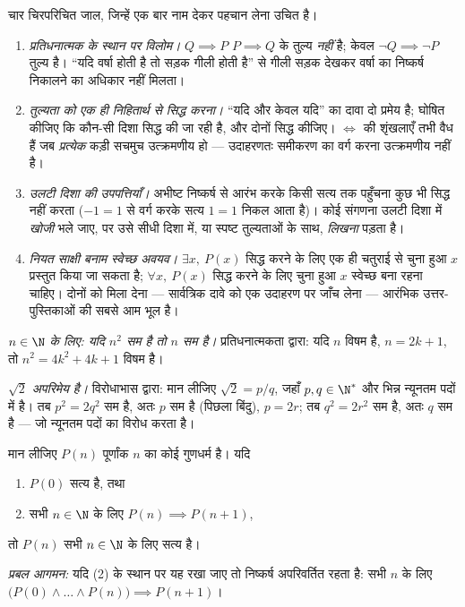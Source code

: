\begin{remark}[उपपत्तियों में सामान्य भूलें]\label{rem:b1:logic:pitfalls}
चार चिरपरिचित जाल, जिन्हें एक बार नाम देकर पहचान लेना उचित है।
\begin{enumerate}
  \item \emph{प्रतिधनात्मक के स्थान पर विलोम।} $Q \implies P$ $P \implies Q$
  के तुल्य \emph{नहीं} है; केवल $\lnot Q \implies \lnot P$ तुल्य है। ``यदि
  वर्षा होती है तो सड़क गीली होती है'' से गीली सड़क देखकर वर्षा का निष्कर्ष
  निकालने का अधिकार नहीं मिलता।
  \item \emph{तुल्यता को एक ही निहितार्थ से सिद्ध करना।} ``यदि और केवल यदि''
  का दावा दो प्रमेय है; घोषित कीजिए कि कौन-सी दिशा सिद्ध की जा रही है, और
  दोनों सिद्ध कीजिए। $\iff$ की शृंखलाएँ तभी वैध हैं जब \emph{प्रत्येक} कड़ी
  सचमुच उत्क्रमणीय हो --- उदाहरणतः समीकरण का वर्ग करना उत्क्रमणीय नहीं है।
  \item \emph{उलटी दिशा की उपपत्तियाँ।} अभीष्ट निष्कर्ष से आरंभ करके किसी
  सत्य  तक पहुँचना कुछ भी सिद्ध नहीं करता ($-1 = 1$ से वर्ग करके सत्य $1
  = 1$ निकल आता है)। कोई संगणना उलटी दिशा में \emph{खोजी} भले जाए, पर उसे
  सीधी दिशा में, या स्पष्ट तुल्यताओं के साथ, \emph{लिखना} पड़ता है।
  \item \emph{नियत साक्षी बनाम स्वेच्छ अवयव।} $\exists x,\ P(x)$ सिद्ध करने
  के लिए एक ही चतुराई से चुना हुआ $x$ प्रस्तुत किया जा सकता है; $\forall x,\
  P(x)$ सिद्ध करने के लिए चुना हुआ $x$ स्वेच्छ बना रहना चाहिए। दोनों को मिला
  देना --- सार्वत्रिक दावे को एक उदाहरण पर जाँच लेना --- आरंभिक
  उत्तर-पुस्तिकाओं की सबसे आम भूल है।
\end{enumerate}
\end{remark}

\begin{example}[प्रतिधनात्मकता और विरोधाभास काम पर]\label{ex:b1:logic:sqrt2}
\emph{$n \in \N$ के लिए: यदि $n^2$ सम है तो $n$ सम है।} प्रतिधनात्मकता
द्वारा: यदि $n$ विषम है, $n = 2k+1$, तो $n^2 = 4k^2 + 4k + 1$ विषम है।

\emph{$\sqrt 2$ अपरिमेय है।} विरोधाभास द्वारा: मान लीजिए $\sqrt 2 = p/q$,
जहाँ $p, q \in \N^*$ और भिन्न न्यूनतम पदों में है। तब $p^2 = 2q^2$ सम है,
अतः $p$ सम है (पिछला बिंदु), $p = 2r$; तब $q^2 = 2r^2$ सम है, अतः $q$ सम है
--- जो न्यूनतम पदों का विरोध करता है।
\end{example}

\begin{theorem}[आगमन]\label{thm:b1:logic:induction}
मान लीजिए $P(n)$ पूर्णांक $n$ का कोई गुणधर्म है। यदि
\begin{enumerate}
  \item $P(0)$ सत्य है, तथा
  \item सभी $n \in \N$ के लिए $P(n) \implies P(n+1)$,
\end{enumerate}
तो $P(n)$ सभी $n \in \N$ के लिए सत्य है।

\emph{प्रबल आगमन:} यदि (2) के स्थान पर यह रखा जाए तो निष्कर्ष अपरिवर्तित
रहता है: सभी $n$ के लिए $\bigl(P(0) \land \dots \land P(n)\bigr) \implies
P(n+1)$।
\end{theorem}

